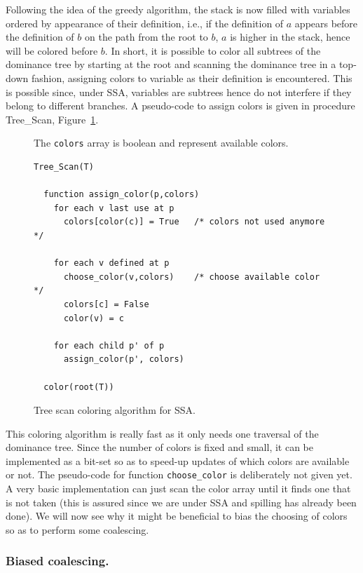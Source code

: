 {Following the idea of the greedy algorithm, the stack is now filled with 
variables ordered by appearance of their definition, i.e., if the definition of 
$a$ appears before the definition of $b$ on the path from the root to $b$, $a$ 
is higher in the stack, hence will be colored before $b$. In short, it is 
possible to color all subtrees of the dominance tree by starting at the root 
and scanning the dominance tree in a top-down fashion, assigning colors to 
variable as their definition is encountered. This is possible since, under SSA,  
variables are subtrees hence do not interfere if they belong to different 
branches. A pseudo-code to assign colors is given in procedure Tree\_Scan,
Figure~\ref{code:assign-tree-scan}.


\begin{figure}
  The {\tt colors} array is boolean and represent available colors.

  \begin{verbatim}
Tree_Scan(T)

  function assign_color(p,colors)
    for each v last use at p
      colors[color(c)] = True   /* colors not used anymore */

    for each v defined at p
      choose_color(v,colors)    /* choose available color */
      colors[c] = False
      color(v) = c

    for each child p' of p
      assign_color(p', colors)

  color(root(T))

  \end{verbatim}
  \caption{Tree scan coloring algorithm for SSA.}
  \label{code:assign-tree-scan}
\end{figure}


This coloring algorithm is really fast as it only needs one traversal of the 
dominance tree. Since the number of colors is fixed and small, it can be 
implemented as a bit-set so as to speed-up updates of which colors are 
available or not. The pseudo-code for function {\tt choose\_color} is 
deliberately not given yet. A very basic implementation can just scan the 
color array until it finds one that is not taken (this is assured since we are 
under SSA and spilling has already been done). We will now see why it might be 
beneficial to bias the choosing of colors so as to perform some coalescing.



\subsubsection{Biased coalescing.}

}
